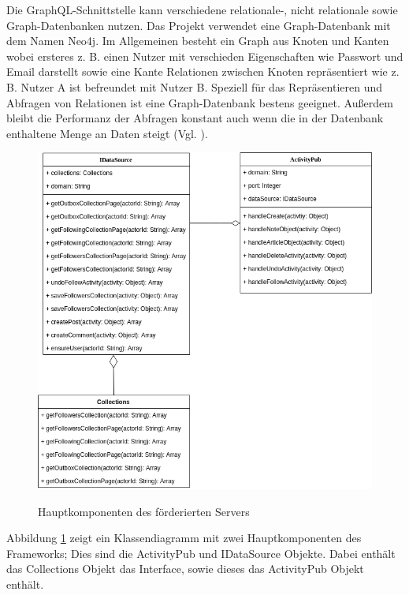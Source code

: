Die GraphQL-Schnittstelle kann verschiedene relationale-, nicht relationale sowie Graph-Datenbanken nutzen. Das Projekt verwendet eine Graph-Datenbank mit dem Namen \glqq Neo4j\grqq. Im Allgemeinen besteht ein Graph aus Knoten und Kanten wobei ersteres z. B. einen Nutzer mit verschieden Eigenschaften wie Passwort und Email darstellt sowie eine Kante Relationen zwischen Knoten repräsentiert wie z. B. Nutzer A ist befreundet mit Nutzer B. Speziell für das Repräsentieren und Abfragen von Relationen ist eine Graph-Datenbank bestens geeignet. Außerdem bleibt die Performanz der Abfragen konstant auch wenn die in der Datenbank enthaltene Menge an Daten steigt (Vgl. \cite{neo4j}).\\
\begin{figure}[h]
	\begin{minipage}{\textwidth}
		\centering
		\includegraphics[scale=0.55]{figures/klassendiagramm-activitypub.png}
		\label{fig:klassendiagramm-activitypub}
		\caption{Hauptkomponenten des förderierten Servers}
	\end{minipage}
\end{figure}
Abbildung \ref{fig:klassendiagramm-activitypub} zeigt ein Klassendiagramm mit zwei Hauptkomponenten des Frameworks; Dies sind die ActivityPub und IDataSource Objekte. Dabei enthält das Collections Objekt das Interface, sowie dieses das ActivityPub Objekt enthält.\\

